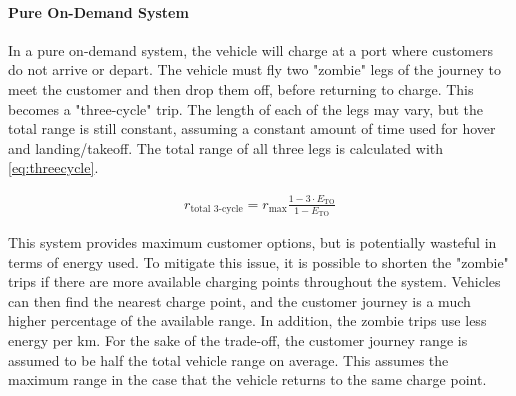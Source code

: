 \paragraph{Pure On-Demand System}
In a pure on-demand system, the vehicle will charge at a port where customers do not arrive or depart. The vehicle must fly two "zombie" legs of the journey to meet the customer and then drop them off, before returning to charge. This becomes a "three-cycle" trip.
The length of each of the legs may vary, but the total range is still constant, assuming a constant amount of time used for hover and landing/takeoff. The total range of all three legs is calculated with \autoref{eq:threecycle}.


\begin{equation}
\label{eq:threecycle}
\begin{split}
    r_\text{total 3-cycle} = r_\text{max}\frac{1-3\cdot E_\text{TO}}{1 - E_\text{TO}}
\end{split}
\end{equation}

This system provides maximum customer options, but is potentially wasteful in terms of energy used. To mitigate this issue, it is possible to shorten the "zombie" trips if there are more available charging points throughout the system. Vehicles can then find the nearest charge point, and the customer journey is a much higher percentage of the available range. In addition, the zombie trips use less energy per km. For the sake of the trade-off, the customer journey range is assumed to be  half the total vehicle range on average. This assumes the maximum range in the case that the vehicle returns to the same charge point.















